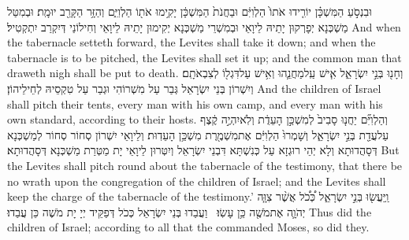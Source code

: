 {וּבִנְסֹ֣עַ הַמִּשְׁכָּ֗ן יוֹרִ֤ידוּ אֹתוֹ֙ הַלְוִיִּ֔ם וּבַחֲנֹת֙ הַמִּשְׁכָּ֔ן יָקִ֥ימוּ אֹת֖וֹ הַלְוִיִּ֑ם וְהַזָּ֥ר הַקָּרֵ֖ב יוּמָֽת׃}
{וּבְמִטַּל מַשְׁכְּנָא יְפָרְקוּן יָתֵיהּ לֵיוָאֵי וּבְמִשְׁרֵי מַשְׁכְּנָא יְקִימוּן יָתֵיהּ לֵיוָאֵי וְחִילוֹנַי דְּיִקְרַב יִתְקְטִיל׃}
{And when the tabernacle setteth forward, the Levites shall take it down; and when the tabernacle is to be pitched, the Levites shall set it up; and the common man that draweth nigh shall be put to death.}{}
{וְחָנ֖וּ בְּנֵ֣י יִשְׂרָאֵ֑ל אִ֧ישׁ עַֽל\maqqaf מַחֲנֵ֛הוּ וְאִ֥ישׁ עַל\maqqaf דִּגְל֖וֹ לְצִבְאֹתָֽם׃}
{וְיִשְׁרוֹן בְּנֵי יִשְׂרָאֵל גְּבַר עַל מִשְׁרוֹהִי וּגְבַר עַל טִקְסֵיהּ לְחֵילֵיהוֹן׃}
{And the children of Israel shall pitch their tents, every man with his own camp, and every man with his own standard, according to their hosts.}{}
{וְהַלְוִיִּ֞ם יַחֲנ֤וּ סָבִיב֙ לְמִשְׁכַּ֣ן הָעֵדֻ֔ת וְלֹֽא\maqqaf יִהְיֶ֣ה קֶ֔צֶף עַל\maqqaf עֲדַ֖ת בְּנֵ֣י יִשְׂרָאֵ֑ל וְשָׁמְרוּ֙ הַלְוִיִּ֔ם אֶת\maqqaf מִשְׁמֶ֖רֶת מִשְׁכַּ֥ן הָעֵדֽוּת׃}
{וְלֵיוָאֵי יִשְׁרוֹן סְחוֹר סְחוֹר לְמַשְׁכְּנָא דְּסָהֲדוּתָא וְלָא יְהֵי רוּגְזָא עַל כְּנִשְׁתָּא דִּבְנֵי יִשְׂרָאֵל וְיִטְּרוּן לֵיוָאֵי יָת מַטְּרַת מַשְׁכְּנָא דְּסָהֲדוּתָא׃}
{But the Levites shall pitch round about the tabernacle of the testimony, that there be no wrath upon the congregation of the children of Israel; and the Levites shall keep the charge of the tabernacle of the testimony.’}{}
{וַֽיַּעֲשׂ֖וּ בְּנֵ֣י יִשְׂרָאֵ֑ל כְּ֠כֹ֠ל אֲשֶׁ֨ר צִוָּ֧ה יְהֹוָ֛ה אֶת\maqqaf מֹשֶׁ֖ה כֵּ֥ן עָשֽׂוּ׃ \petucha }
{וַעֲבַדוּ בְּנֵי יִשְׂרָאֵל כְּכֹל דְּפַקֵּיד יְיָ יָת מֹשֶׁה כֵּן עֲבַדוּ׃}
{Thus did the children of Israel; according to all that the \lord\space commanded Moses, so did they.}{}

